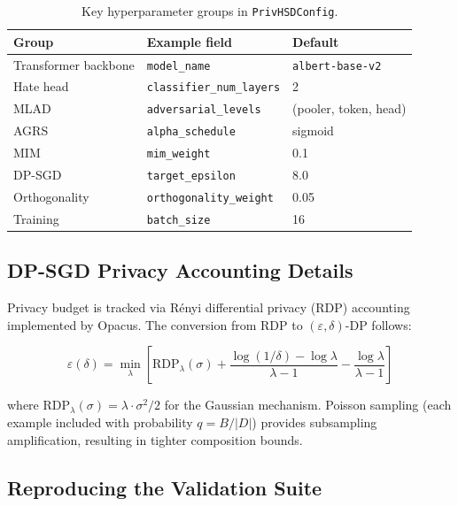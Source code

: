 \documentclass{article}
\begin{document}
\begin{table}[h]
  \centering
  \caption{Key hyperparameter groups in \texttt{PrivHSDConfig}.}
  \label{tab:config}
  \begin{tabular}{lll}
    \toprule
    \textbf{Group} & \textbf{Example field} & \textbf{Default} \\
    \midrule
    Transformer backbone & \texttt{model\_name} & \texttt{albert-base-v2} \\
    Hate head & \texttt{classifier\_num\_layers} & 2 \\
    MLAD & \texttt{adversarial\_levels} & (pooler, token, head) \\
    AGRS & \texttt{alpha\_schedule} & sigmoid \\
    MIM & \texttt{mim\_weight} & 0.1 \\
    DP-SGD & \texttt{target\_epsilon} & 8.0 \\
    Orthogonality & \texttt{orthogonality\_weight} & 0.05 \\
    Training & \texttt{batch\_size} & 16 \\
    \bottomrule
  \end{tabular}
\end{table}

\subsection{DP-SGD Privacy Accounting Details}

Privacy budget is tracked via R\'enyi differential privacy (RDP)
accounting implemented by Opacus.
The conversion from RDP to $(\varepsilon,\delta)$-DP follows:

\begin{equation}
\label{eq:rdp}
\varepsilon(\delta) = \min_{\lambda} \left[
\text{RDP}_{\lambda}(\sigma) + \frac{\log(1/\delta) - \log\lambda}{\lambda - 1}
- \frac{\log\lambda}{\lambda - 1}
\right]
\end{equation}

\noindent
where $\text{RDP}_{\lambda}(\sigma) = \lambda \cdot \sigma^2 / 2$ for
the Gaussian mechanism.
Poisson sampling (each example included with probability
$q = B / |D|$) provides subsampling amplification, resulting in
tighter composition bounds.

\subsection{Reproducing the Validation Suite}
\end{document}
